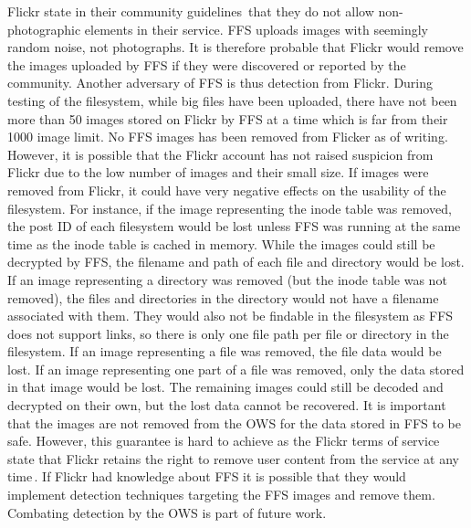 Flickr state in their community guidelines\,\cite{flickrinc.FlickrCommunityGuidelines2022} that they do not allow non-photographic elements in their service. \gls{FFS} uploads images with seemingly random noise, not photographs. It is therefore probable that Flickr would remove the images uploaded by \gls{FFS} if they were discovered or reported by the community. Another adversary of \gls{FFS} is thus detection from Flickr. During testing of the filesystem, while big files have been uploaded, there have not been more than 50 images stored on Flickr by \gls{FFS} at a time which is far from their \num{1000} image limit. No \gls{FFS} images has been removed from Flicker as of writing. However, it is possible that the Flickr account has not raised suspicion from Flickr due to the low number of images and their small size. If images were removed from Flickr, it could have very negative effects on the usability of the filesystem. For instance, if the image representing the inode table was removed, the post ID of each filesystem would be lost unless \gls{FFS} was running at the same time as the inode table is cached in memory. While the images could still be decrypted by \gls{FFS}, the filename and path of each file and directory would be lost. If an image representing a directory was removed (but the inode table was not removed), the files and directories in the directory would not have a filename associated with them. They would also not be findable in the filesystem as \gls{FFS} does not support links, so there is only one file path per file or directory in the filesystem. If an image representing a file was removed, the file data would be lost. If an image representing one part of a file was removed, only the data stored in that image would be lost. The remaining images could still be decoded and decrypted on their own, but the lost data cannot be recovered. It is important that the images are not removed from the \gls{OWS} for the data stored in \gls{FFS} to be safe. However, this guarantee is hard to achieve as the Flickr terms of service state that Flickr retains the right to remove user content from the service at any time\,\cite{flickrinc.FlickrTermsConditions2020}. If Flickr had knowledge about \gls{FFS} it is possible that they would implement detection techniques targeting the \gls{FFS} images and remove them. Combating detection by the \gls{OWS} is part of future work.

%
%
